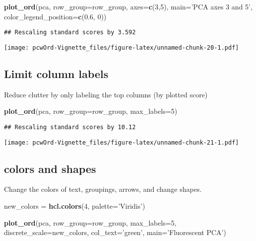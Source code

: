 \documentclass[
]{article}
\newenvironment{Shaded}{\begin{snugshade}}{\end{snugshade}}
\newcommand{\DataTypeTok}[1]{\textcolor[rgb]{0.13,0.29,0.53}{#1}}
\newcommand{\DecValTok}[1]{\textcolor[rgb]{0.00,0.00,0.81}{#1}}
\newcommand{\FloatTok}[1]{\textcolor[rgb]{0.00,0.00,0.81}{#1}}
\newcommand{\KeywordTok}[1]{\textcolor[rgb]{0.13,0.29,0.53}{\textbf{#1}}}
\newcommand{\NormalTok}[1]{#1}
\newcommand{\StringTok}[1]{\textcolor[rgb]{0.31,0.60,0.02}{#1}}
\begin{document}
\begin{Shaded}
\begin{Highlighting}[]
\KeywordTok{plot_ord}\NormalTok{(pca, }
         \DataTypeTok{row_group=}\NormalTok{row_group, }
         \DataTypeTok{axes=}\KeywordTok{c}\NormalTok{(}\DecValTok{3}\NormalTok{,}\DecValTok{5}\NormalTok{), }
         \DataTypeTok{main=}\StringTok{'PCA axes 3 and 5'}\NormalTok{,}
         \DataTypeTok{color_legend_position=}\KeywordTok{c}\NormalTok{(}\FloatTok{0.6}\NormalTok{, }\DecValTok{0}\NormalTok{))}
\end{Highlighting}
\end{Shaded}

\begin{verbatim}
## Rescaling standard scores by 3.592
\end{verbatim}

\texttt{[image: pcwOrd-Vignette\_files/figure-latex/unnamed-chunk-20-1.pdf]}

\hypertarget{limit-column-labels}{%
\subsection{Limit column labels}\label{limit-column-labels}}

Reduce clutter by only labeling the top columns (by plotted score)

\begin{Shaded}
\begin{Highlighting}[]
\KeywordTok{plot_ord}\NormalTok{(pca, }
         \DataTypeTok{row_group=}\NormalTok{row_group, }
         \DataTypeTok{max_labels=}\DecValTok{5}\NormalTok{)}
\end{Highlighting}
\end{Shaded}

\begin{verbatim}
## Rescaling standard scores by 10.12
\end{verbatim}

\texttt{[image: pcwOrd-Vignette\_files/figure-latex/unnamed-chunk-21-1.pdf]}

\hypertarget{colors-and-shapes}{%
\subsection{colors and shapes}\label{colors-and-shapes}}

Change the colors of text, groupings, arrows, and change shapes.

\begin{Shaded}
\begin{Highlighting}[]
\NormalTok{new_colors =}\StringTok{ }\KeywordTok{hcl.colors}\NormalTok{(}\DecValTok{4}\NormalTok{, }\DataTypeTok{palette=}\StringTok{'Viridis'}\NormalTok{)}

\KeywordTok{plot_ord}\NormalTok{(pca, }
         \DataTypeTok{row_group=}\NormalTok{row_group, }
         \DataTypeTok{max_labels=}\DecValTok{5}\NormalTok{, }
         \DataTypeTok{discrete_scale=}\NormalTok{new_colors,}
         \DataTypeTok{col_text=}\StringTok{'green'}\NormalTok{, }
         \DataTypeTok{main=}\StringTok{'Fluorescent PCA'}\NormalTok{)}
\end{Highlighting}
\end{Shaded}
\end{document}
